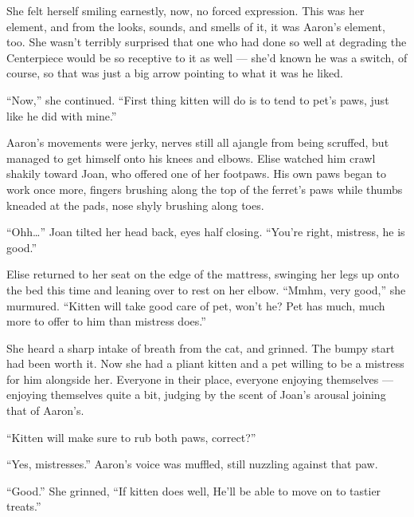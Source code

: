 She felt herself smiling earnestly, now, no forced expression. This was
her element, and from the looks, sounds, and smells of it, it was
Aaron's element, too. She wasn't terribly surprised that one who had
done so well at degrading the Centerpiece would be so receptive to it as
well --- she'd known he was a switch, of course, so that was just a big
arrow pointing to what it was he liked.

``Now,'' she continued. ``First thing kitten will do is to tend to pet's
paws, just like he did with mine.''

Aaron's movements were jerky, nerves still all ajangle from being
scruffed, but managed to get himself onto his knees and elbows. Elise
watched him crawl shakily toward Joan, who offered one of her footpaws.
His own paws began to work once more, fingers brushing along the top of
the ferret's paws while thumbs kneaded at the pads, nose shyly brushing
along toes.

``Ohh\ldots{}'' Joan tilted her head back, eyes half closing. ``You're
right, mistress, he is good.''

Elise returned to her seat on the edge of the mattress, swinging her
legs up onto the bed this time and leaning over to rest on her elbow.
``Mmhm, very good,'' she murmured. ``Kitten will take good care of pet,
won't he? Pet has much, much more to offer to him than mistress does.''

She heard a sharp intake of breath from the cat, and grinned. The bumpy
start had been worth it. Now she had a pliant kitten and a pet willing
to be a mistress for him alongside her. Everyone in their place,
everyone enjoying themselves --- enjoying themselves quite a bit,
judging by the scent of Joan's arousal joining that of Aaron's.

``Kitten will make sure to rub both paws, correct?''

``Yes, mistresses.'' Aaron's voice was muffled, still nuzzling against
that paw.

``Good.'' She grinned, ``If kitten does well, He'll be able to move on
to tastier treats.''

